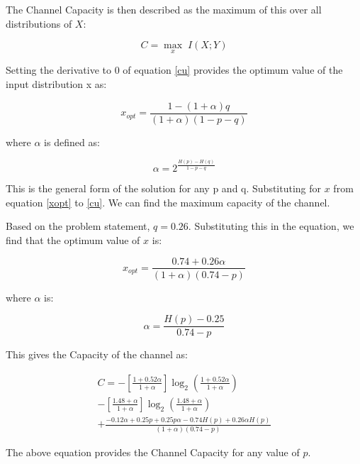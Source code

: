 The Channel Capacity is then described as the maximum of this over all distributions of $X$:

\begin{equation}
\label{cu}
    C = \underset{x}{\max} \; I(X;Y)
\end{equation}

Setting the derivative to $0$ of equation \ref{cu} provides the optimum value of the input distribution x as:

\begin{equation}
\label{xopt}
    x_{opt} = \frac{1-(1+\alpha)q}{(1+\alpha)(1-p-q)}
\end{equation}

where $\alpha$ is defined as:

\begin{equation}
    \alpha = 2^{\frac{H(p)-H(q)}{1-p-q}}
\end{equation}

This is the general form of the solution for any p and q. Substituting for $x$ from equation \ref{xopt} to \ref{cu}. We can find the maximum capacity of the channel.

Based on the problem statement, $q = 0.26$. Substituting this in the equation, we find that the optimum value of $x$ is:

\begin{equation}
    x_{opt} = \frac{0.74+0.26\alpha}{(1+\alpha)(0.74-p)}
\end{equation}

where $\alpha$ is:

\begin{equation}
    \alpha = \frac{H(p)-0.25}{0.74-p}    
\end{equation}

This gives the Capacity of the channel as:

\begin{multline}
\label{c}
    C = -\left[\frac{1+0.52\alpha}{1+\alpha}\right]\log_2\left(\frac{1+0.52\alpha}{1+\alpha}\right)\\-\left[\frac{1.48+\alpha}{1+\alpha}\right]\log_2\left(\frac{1.48+\alpha}{1+\alpha}\right)\\+\frac{-0.12\alpha+0.25p+0.25p\alpha-0.74H(p)+0.26\alpha H(p)}{(1+\alpha)(0.74-p)}
\end{multline}

The above equation provides the Channel Capacity for any value of $p$.